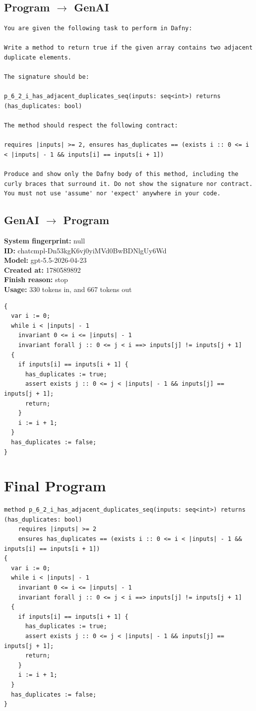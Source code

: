 \documentclass{article}
\begin{document}
\subsection*{Program $\rightarrow$ GenAI}
\begin{lstlisting}
You are given the following task to perform in Dafny:

Write a method to return true if the given array contains two adjacent duplicate elements.

The signature should be:

p_6_2_i_has_adjacent_duplicates_seq(inputs: seq<int>) returns (has_duplicates: bool)

The method should respect the following contract:

requires |inputs| >= 2, ensures has_duplicates == (exists i :: 0 <= i < |inputs| - 1 && inputs[i] == inputs[i + 1])

Produce and show only the Dafny body of this method, including the curly braces that surround it. Do not show the signature nor contract. You must not use 'assume' nor 'expect' anywhere in your code.
\end{lstlisting}
\subsection*{GenAI $\rightarrow$ Program}
\textbf{System fingerprint: }null
\\\textbf{ID: }chatcmpl-Dn53kgK6vj0yiMVd0BwBDNlgUy6Wd
\\\textbf{Model: }gpt-5.5-2026-04-23
\\\textbf{Created at: }1780589892
\\\textbf{Finish reason: }stop
\\\textbf{Usage: }330 tokens in, and 667 tokens out
\begin{lstlisting}
{
  var i := 0;
  while i < |inputs| - 1
    invariant 0 <= i <= |inputs| - 1
    invariant forall j :: 0 <= j < i ==> inputs[j] != inputs[j + 1]
  {
    if inputs[i] == inputs[i + 1] {
      has_duplicates := true;
      assert exists j :: 0 <= j < |inputs| - 1 && inputs[j] == inputs[j + 1];
      return;
    }
    i := i + 1;
  }
  has_duplicates := false;
}
\end{lstlisting}
\section*{Final Program}
\begin{lstlisting}
method p_6_2_i_has_adjacent_duplicates_seq(inputs: seq<int>) returns (has_duplicates: bool)
	requires |inputs| >= 2
	ensures has_duplicates == (exists i :: 0 <= i < |inputs| - 1 && inputs[i] == inputs[i + 1])
{
  var i := 0;
  while i < |inputs| - 1
    invariant 0 <= i <= |inputs| - 1
    invariant forall j :: 0 <= j < i ==> inputs[j] != inputs[j + 1]
  {
    if inputs[i] == inputs[i + 1] {
      has_duplicates := true;
      assert exists j :: 0 <= j < |inputs| - 1 && inputs[j] == inputs[j + 1];
      return;
    }
    i := i + 1;
  }
  has_duplicates := false;
}
\end{lstlisting}
\end{document}
